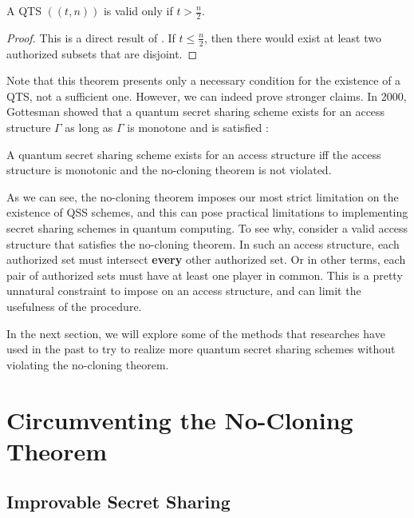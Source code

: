 \begin{theorem}
    \label{thm:qts}
    A QTS $((t,n))$ is valid only if $t > \frac{n}{2}$.
\end{theorem}

\begin{proof}
    This is a direct result of . If $t \leq \frac{n}{2}$, then there would exist at least two authorized subsets that are disjoint. 
\end{proof}

Note that this theorem presents only a necessary condition for the existence of a QTS, not a sufficient one. However, we can indeed prove stronger claims. In 2000, Gottesman showed that a quantum secret sharing scheme exists for an access structure $\Gamma$ as long as $\Gamma$ is monotone and  is satisfied \cite{gottesman_theory_2000}:

\begin{theorem}
    \label{thm:monotone-gamma}
    A quantum secret sharing scheme exists for an access structure iff the access structure is monotonic and the no-cloning theorem is not violated.
\end{theorem}

As we can see, the no-cloning theorem imposes our most strict limitation on the existence of QSS schemes, and this can pose practical limitations to implementing secret sharing schemes in quantum computing. To see why, consider a valid access structure that satisfies the no-cloning theorem. In such an access structure, each authorized set must intersect \textbf{every} other authorized set. Or in other terms, each pair of authorized sets must have at least one player in common. This is a pretty unnatural constraint to impose on an access structure, and can limit the usefulness of the procedure.

In the next section, we will explore some of the methods that researches have used in the past to try to realize more quantum secret sharing schemes without violating the no-cloning theorem.

\section{Circumventing the No-Cloning Theorem}

\subsection{Improvable Secret Sharing}
\label{ssec:improvable}

